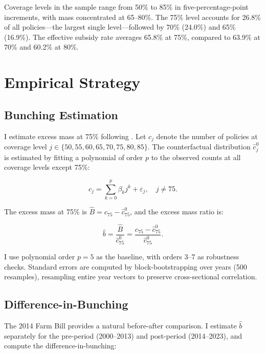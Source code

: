 \documentclass[12pt]{article}
\begin{document}
Coverage levels in the sample range from 50\% to 85\% in five-percentage-point increments, with mass concentrated at 65--80\%. The 75\% level accounts for 26.8\% of all policies---the largest single level---followed by 70\% (24.0\%) and 65\% (16.9\%). The effective subsidy rate averages 65.8\% at 75\%, compared to 63.9\% at 70\% and 60.2\% at 80\%.


\section{Empirical Strategy}

\subsection{Bunching Estimation}

I estimate excess mass at 75\% following \citet{kleven2013}. Let $c_j$ denote the number of policies at coverage level $j \in \{50, 55, 60, 65, 70, 75, 80, 85\}$. The counterfactual distribution $\hat{c}_j^0$ is estimated by fitting a polynomial of order $p$ to the observed counts at all coverage levels except 75\%:

\begin{equation}
c_j = \sum_{k=0}^{p} \beta_k j^k + \varepsilon_j, \quad j \neq 75.
\end{equation}

The excess mass at 75\% is $\hat{B} = c_{75} - \hat{c}_{75}^0$, and the excess mass ratio is:

\begin{equation}
\hat{b} = \frac{\hat{B}}{\hat{c}_{75}^0} = \frac{c_{75} - \hat{c}_{75}^0}{\hat{c}_{75}^0}.
\end{equation}

I use polynomial order $p = 5$ as the baseline, with orders 3--7 as robustness checks. Standard errors are computed by block-bootstrapping over years (500 resamples), resampling entire year vectors to preserve cross-sectional correlation.

\subsection{Difference-in-Bunching}

The 2014 Farm Bill provides a natural before-after comparison. I estimate $\hat{b}$ separately for the pre-period (2000--2013) and post-period (2014--2023), and compute the difference-in-bunching:
\end{document}
